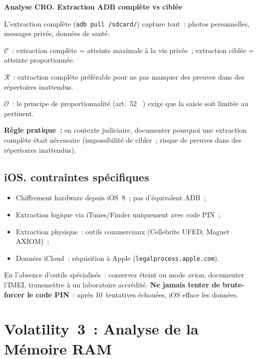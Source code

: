 \begin{boxCRO}
\textbf{Analyse CRO. Extraction ADB complète vs ciblée}

L'extraction complète (\texttt{adb pull /sdcard/}) capture tout~:
photos personnelles, messages privés, données de santé.

$\mathcal{C}$~: extraction complète = atteinte maximale à la vie privée~;
extraction ciblée = atteinte proportionnée.

$\mathcal{R}$~: extraction complète préférable pour ne pas manquer
des preuves dans des répertoires inattendus.

$\mathcal{O}$~: le principe de proportionnalité (art.~52
~\cite{cameroun2010a}) exige que la saisie soit limitée au pertinent.


\textbf{Règle pratique~:} en contexte judiciaire, documenter pourquoi
une extraction complète était nécessaire (impossibilité de cibler~;
risque de preuves dans des répertoires inattendus).
\end{boxCRO}

\subsection{iOS. contraintes spécifiques}

\begin{itemize}
    \item Chiffrement hardware depuis iOS~8~; pas d'équivalent ADB~;
    \item Extraction logique via iTunes/Finder uniquement avec code PIN~;
    \item Extraction physique~: outils commerciaux (Cellebrite UFED,
          Magnet AXIOM)~;
    \item Données iCloud~: réquisition à Apple
          (\texttt{legalprocess.apple.com}).
\end{itemize}

En l'absence d'outils spécialisés~: conserver éteint ou mode avion,
documenter l'IMEI, transmettre à un laboratoire accrédité.
\textbf{Ne jamais tenter de brute-forcer le code PIN}~: après
10~tentatives échouées, iOS efface les données.

\section{Volatility~3~: Analyse de la Mémoire RAM}
\label{sec:volatility}

